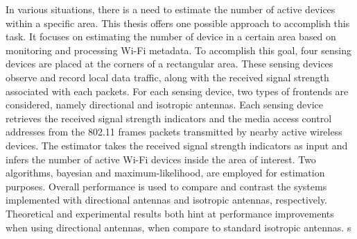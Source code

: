 \TAMUAbstractFormat

In various situations, there is a need to estimate the number of active devices within a specific area.
This thesis offers one possible approach to accomplish this task.
It focuses on estimating the number of device in a certain area based on monitoring and processing Wi-Fi metadata.
To accomplish this goal, four sensing devices are placed at the corners of a rectangular area.
These sensing devices observe and record local data traffic, along with the received signal strength associated with each packets.
For each sensing device, two types of frontends are considered, namely directional and isotropic antennas.
Each sensing device retrieves the received signal strength indicators and the media access control addresses from the 802.11 frames packets transmitted by nearby active wireless devices.
The estimator takes the received signal strength indicators as input and infers the number of active Wi-Fi devices inside the area of interest.
Two algorithms, bayesian and maximum-likelihood, are employed for estimation purposes.
Overall performance is used to compare and contrast the systems implemented with directional antennas and isotropic antennas, respectively.
Theoretical and experimental results both hint at performance improvements when using directional antennas, when compare to standard isotropic antennas.
s

